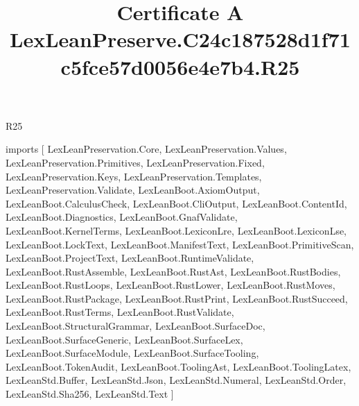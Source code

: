 \begin{lexlean}{R25}
\title{Certificate A LexLeanPreserve.C24c187528d1f71c5fce57d0056e4e7b4.R25}
\begin{coremodule}
imports [
  LexLeanPreservation.Core,
  LexLeanPreservation.Values,
  LexLeanPreservation.Primitives,
  LexLeanPreservation.Fixed,
  LexLeanPreservation.Keys,
  LexLeanPreservation.Templates,
  LexLeanPreservation.Validate,
  LexLeanBoot.AxiomOutput,
  LexLeanBoot.CalculusCheck,
  LexLeanBoot.CliOutput,
  LexLeanBoot.ContentId,
  LexLeanBoot.Diagnostics,
  LexLeanBoot.GnafValidate,
  LexLeanBoot.KernelTerms,
  LexLeanBoot.LexiconLre,
  LexLeanBoot.LexiconLse,
  LexLeanBoot.LockText,
  LexLeanBoot.ManifestText,
  LexLeanBoot.PrimitiveScan,
  LexLeanBoot.ProjectText,
  LexLeanBoot.RuntimeValidate,
  LexLeanBoot.RustAssemble,
  LexLeanBoot.RustAst,
  LexLeanBoot.RustBodies,
  LexLeanBoot.RustLoops,
  LexLeanBoot.RustLower,
  LexLeanBoot.RustMoves,
  LexLeanBoot.RustPackage,
  LexLeanBoot.RustPrint,
  LexLeanBoot.RustSucceed,
  LexLeanBoot.RustTerms,
  LexLeanBoot.RustValidate,
  LexLeanBoot.StructuralGrammar,
  LexLeanBoot.SurfaceDoc,
  LexLeanBoot.SurfaceGeneric,
  LexLeanBoot.SurfaceLex,
  LexLeanBoot.SurfaceModule,
  LexLeanBoot.SurfaceTooling,
  LexLeanBoot.TokenAudit,
  LexLeanBoot.ToolingAst,
  LexLeanBoot.ToolingLatex,
  LexLeanStd.Buffer,
  LexLeanStd.Json,
  LexLeanStd.Numeral,
  LexLeanStd.Order,
  LexLeanStd.Sha256,
  LexLeanStd.Text
]


\end{coremodule}
\end{lexlean}
